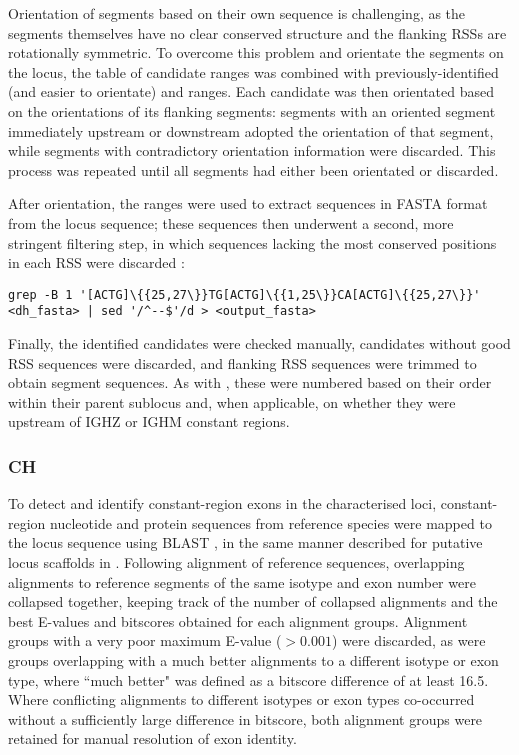 Orientation of \dh segments based on their own sequence is challenging, as the segments themselves have no clear conserved structure and the flanking RSSs are rotationally symmetric. To overcome this problem and orientate the \dh segments on the locus, the table of \dh candidate ranges was combined with previously-identified (and easier to orientate) \vh and \jh ranges. Each \dh candidate was then orientated based on the orientations of its flanking segments: segments with an oriented segment immediately upstream or downstream adopted the orientation of that segment, while segments with contradictory orientation information were discarded. This process was repeated until all \dh segments had either been orientated or discarded.

After orientation, the \dh ranges were used to extract \dh sequences in FASTA format from the locus sequence; these sequences then underwent a second, more stringent filtering step, in which sequences lacking the most conserved positions in each RSS were discarded \parencite{grep}:

\begin{lstlisting}
grep -B 1 '[ACTG]\{{25,27\}}TG[ACTG]\{{1,25\}}CA[ACTG]\{{25,27\}}' <dh_fasta> | sed '/^--$'/d > <output_fasta>
\end{lstlisting}

Finally, the identified \dh candidates were checked manually, candidates without good RSS sequences were discarded, and flanking RSS sequences were trimmed to obtain \dh segment sequences. As with \jh, these were numbered based on their order within their parent sublocus and, when applicable, on whether they were upstream of IGHZ or IGHM constant regions.

\subsubsection{CH}
\label{sec:locus_char_ch}

To detect and identify constant-region exons in the characterised loci, constant-region nucleotide and protein sequences from reference species were mapped to the locus sequence using BLAST \parencite{altschul1990blast,altschul1997blast}, in the same manner described for putative locus scaffolds in .
Following alignment of reference sequences, overlapping alignments to reference segments of the same isotype and exon number were collapsed together, keeping track of the number of collapsed alignments and the best E-values and bitscores obtained for each alignment groups. Alignment groups with a very poor maximum E-value ($> 0.001$) were discarded, as were groups overlapping with a much better alignments to a different isotype or exon type, where ``much better" was defined as a bitscore difference of at least 16.5. Where conflicting alignments to different isotypes or exon types co-occurred without a sufficiently large difference in bitscore, both alignment groups were retained for manual resolution of exon identity.

